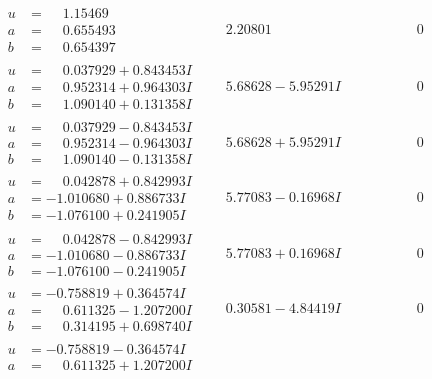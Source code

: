 \documentclass[1p]{elsarticle_modified}
\theoremstyle{definition}
\begin{document}
$$\begin{array}{c|c|c}
\begin{aligned}
u &= \phantom{-}1.15469\phantom{ +0.000000I} \\
a &= \phantom{-}0.655493\phantom{ +0.000000I} \\
b &= \phantom{-}0.654397\phantom{ +0.000000I}\end{aligned}
 & \phantom{-}2.20801\phantom{ +0.000000I} & \phantom{-0.000000 } 0 \\ \hline\begin{aligned}
u &= \phantom{-}0.037929 + 0.843453 I \\
a &= \phantom{-}0.952314 + 0.964303 I \\
b &= \phantom{-}1.090140 + 0.131358 I\end{aligned}
 & \phantom{-}5.68628 - 5.95291 I & \phantom{-0.000000 } 0 \\ \hline\begin{aligned}
u &= \phantom{-}0.037929 - 0.843453 I \\
a &= \phantom{-}0.952314 - 0.964303 I \\
b &= \phantom{-}1.090140 - 0.131358 I\end{aligned}
 & \phantom{-}5.68628 + 5.95291 I & \phantom{-0.000000 } 0 \\ \hline\begin{aligned}
u &= \phantom{-}0.042878 + 0.842993 I \\
a &= -1.010680 + 0.886733 I \\
b &= -1.076100 + 0.241905 I\end{aligned}
 & \phantom{-}5.77083 - 0.16968 I & \phantom{-0.000000 } 0 \\ \hline\begin{aligned}
u &= \phantom{-}0.042878 - 0.842993 I \\
a &= -1.010680 - 0.886733 I \\
b &= -1.076100 - 0.241905 I\end{aligned}
 & \phantom{-}5.77083 + 0.16968 I & \phantom{-0.000000 } 0 \\ \hline\begin{aligned}
u &= -0.758819 + 0.364574 I \\
a &= \phantom{-}0.611325 - 1.207200 I \\
b &= \phantom{-}0.314195 + 0.698740 I\end{aligned}
 & \phantom{-}0.30581 - 4.84419 I & \phantom{-0.000000 } 0 \\ \hline\begin{aligned}
u &= -0.758819 - 0.364574 I \\
a &= \phantom{-}0.611325 + 1.207200 I \\

\end{aligned}
\end{array}$$
\end{document}
